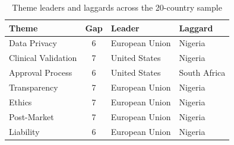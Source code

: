 \begin{table}[htbp]
\centering
\caption[Theme leaders and laggards]{Theme leaders and laggards across the 20-country sample}
\label{tab:theme-leaders}
\begin{tabular}{@{}l c l l@{}}
\toprule
\textbf{Theme} & \textbf{Gap} & \textbf{Leader} & \textbf{Laggard} \\
\midrule
Data Privacy & 6 & European Union & Nigeria \\
Clinical Validation & 7 & United States & Nigeria \\
Approval Process & 6 & United States & South Africa \\
Transparency & 7 & European Union & Nigeria \\
Ethics & 7 & European Union & Nigeria \\
Post-Market & 7 & European Union & Nigeria \\
Liability & 6 & European Union & Nigeria \\
\bottomrule
\end{tabular}
\end{table}
